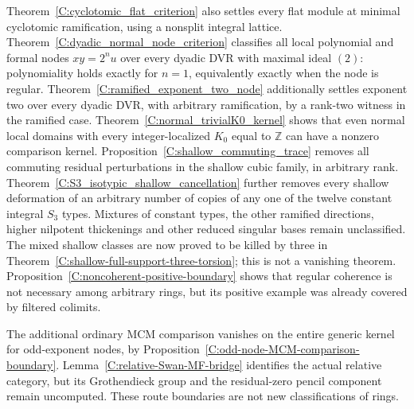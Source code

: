 Theorem~\ref{C:cyclotomic_flat_criterion} also settles every flat
module at minimal cyclotomic ramification, using a nonsplit integral
lattice. Theorem~\ref{C:dyadic_normal_node_criterion} classifies
all local polynomial and formal nodes $xy=2^n u$ over every dyadic DVR
with maximal ideal $(2)$: polynomiality holds exactly for $n=1$,
equivalently exactly when the node is regular.
Theorem~\ref{C:ramified_exponent_two_node} additionally settles exponent
two over every dyadic DVR, with arbitrary ramification, by a rank-two
witness in the ramified case.
Theorem~\ref{C:normal_trivialK0_kernel} shows that even normal local
domains with every integer-localized $K_0$ equal to $\mathbb Z$
can have a nonzero comparison kernel.
Proposition~\ref{C:shallow_commuting_trace} removes all commuting
residual perturbations in the shallow cubic family, in arbitrary rank.
Theorem~\ref{C:S3_isotypic_shallow_cancellation} further removes every
shallow deformation of an arbitrary number of copies of any one of the
twelve constant integral $S_3$ types. Mixtures of constant types, the
other ramified directions, higher nilpotent thickenings and other
reduced singular bases remain unclassified.
The mixed shallow classes are now proved to be killed by three in
Theorem~\ref{C:shallow-full-support-three-torsion}; this is not a
vanishing theorem. Proposition~\ref{C:noncoherent-positive-boundary}
shows that regular coherence is not necessary among arbitrary rings,
but its positive example was already covered by filtered colimits.

The additional ordinary MCM comparison vanishes on the entire generic
kernel for odd-exponent nodes, by
Proposition~\ref{C:odd-node-MCM-comparison-boundary}.
Lemma~\ref{C:relative-Swan-MF-bridge} identifies the actual relative
category, but its Grothendieck group and the residual-zero pencil
component remain uncomputed. These route boundaries are not new
classifications of rings.

